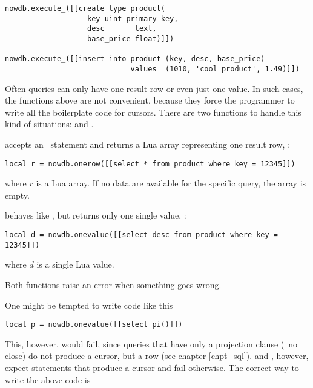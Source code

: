 \begin{lua}
\begin{lstlisting}
nowdb.execute_([[create type product(
                   key uint primary key,
                   desc       text,
                   base_price float)]])

nowdb.execute_([[insert into product (key, desc, base_price)
                             values  (1010, 'cool product', 1.49)]])
\end{lstlisting}
\end{lua}

Often queries can only have one result row or even
just one value. In such cases, the functions above
are not convenient, because they force the programmer
to write all the boilerplate code for cursors.
There are two functions to handle this kind of
situations:  and
.

 accepts an \sql\ statement
and returns a Lua array representing one
result row, \eg:

\begin{lua}
\begin{lstlisting}
local r = nowdb.onerow([[select * from product where key = 12345]])
\end{lstlisting}
\end{lua}

where $r$ is a Lua array.
If no data are available for the specific query,
the array is empty.

 behaves like ,
but returns only one single value, \eg:

\begin{lua}
\begin{lstlisting}
local d = nowdb.onevalue([[select desc from product where key = 12345]])
\end{lstlisting}
\end{lua}

where $d$ is a single Lua value.

Both functions raise an error when something goes wrong.

One might be tempted to write code like this

\begin{lua}
\begin{lstlisting}
local p = nowdb.onevalue([[select pi()]])
\end{lstlisting}
\end{lua}

This, however, would fail, since queries
that have only a projection clause (\ie\ no  close)
do not produce a cursor, but a row (see chapter \ref{chpt_sql}).
 and , however, expect
statements that produce a cursor and fail otherwise.
The correct way to write the above code is

